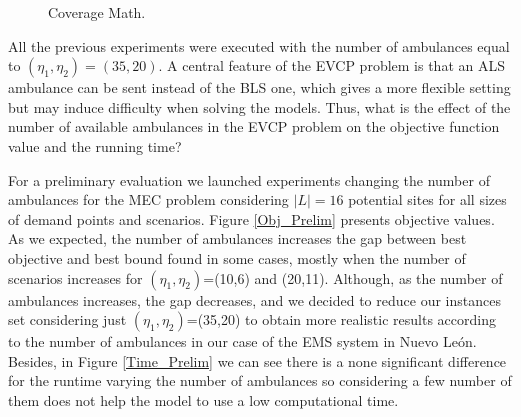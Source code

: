 \begin{figure}[H]
\hspace{0.4cm}%
\vspace{0.4cm}
\caption{Coverage Math.}
\label{Cov_Math}
\end{figure}



 All the previous experiments were executed with the number of ambulances equal to $(\eta_1,\eta_2)=   (35,20) $. A central feature of the EVCP problem is that an ALS ambulance can be sent instead of the BLS one, which gives a more flexible setting but may induce difficulty when solving the models. 
 Thus, what is the effect of the number of available ambulances in the EVCP problem on the objective function value and the running time?

For a preliminary evaluation we launched experiments changing the number of ambulances for the MEC problem considering $|L|=16$ potential sites for all sizes of demand points and scenarios. Figure \ref{Obj_Prelim} presents objective values. As we expected, the number of ambulances increases the gap between best objective and best bound found in some cases, mostly when the number of scenarios increases for  $(\eta_1,\eta_2)$=(10,6) and (20,11). Although, as the number of am\-bu\-lan\-ces increases, the gap decreases, and we decided to reduce our instances set considering just $(\eta_1,\eta_2)$=(35,20) to obtain more realistic results according to the number of ambulances in our case of the EMS system in Nuevo León. Besides, in Figure \ref{Time_Prelim} we can see there is a none significant difference for the runtime varying the number of ambulances so considering a few number of them does not help the model to use a low computational time.

